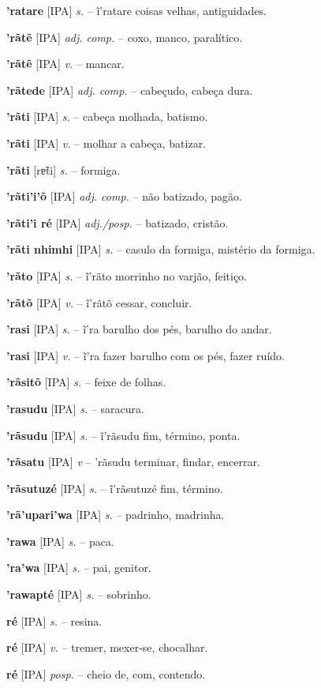 \textbf{'ratare} [IPA] \textit{s.} -- ĩ'ratare coisas velhas, antiguidades.

\textbf{'rãtẽ} [IPA] \textit{adj. comp.} -- coxo, manco, paralítico.

\textbf{'rãtẽ} [IPA] \textit{v.} -- mancar.

\textbf{'rãtede} [IPA] \textit{adj. comp.} -- cabeçudo, cabeça dura.

\textbf{'rãti} [IPA] \textit{s.} -- cabeça molhada, batismo.

\textbf{'rãti} [IPA] \textit{v.} -- molhar a cabeça, batizar.

\textbf{'rãti} [rɐ̃ti] \textit{s.} -- formiga.

\textbf{'rãti'i'õ} [IPA] \textit{adj. comp.} -- não batizado, pagão.

\textbf{'rãti'i ré} [IPA] \textit{adj./posp.} -- batizado, cristão.

\textbf{'rãti nhimhi} [IPA] \textit{s.} -- casulo da formiga, mistério da formiga.

\textbf{'rãto} [IPA] \textit{s.} -- ĩ'rãto morrinho no varjão, feitiço.

\textbf{'rãtõ} [IPA] \textit{v.} -- ĩ'rãtõ cessar, concluir.

\textbf{'rasi} [IPA] \textit{s.} -- ĩ'ra barulho dos pés, barulho do andar.

\textbf{'rasi} [IPA] \textit{v.} -- ĩ'ra fazer barulho com os pés, fazer ruído.

\textbf{'rãsitõ} [IPA] \textit{s.} -- feixe de folhas.

\textbf{'rasudu} [IPA] \textit{s.} -- saracura.

\textbf{'rãsudu} [IPA] \textit{s.} -- ĩ'rãsudu fim, término, ponta.

\textbf{'rãsatu} [IPA] \textit{v} -- 'rãsudu terminar, findar, encerrar.

\textbf{'rãsutuzé} [IPA] \textit{s.} -- ĩ'rãsutuzé fim, término.

\textbf{'rã'upari'wa} [IPA] \textit{s.} -- padrinho, madrinha.

\textbf{'rawa} [IPA] \textit{s.} -- paca.

\textbf{'ra'wa} [IPA] \textit{s.} -- pai, genitor.

\textbf{'rawapté} [IPA] \textit{s.} -- sobrinho.

\textbf{ré} [IPA] \textit{s.} -- resina.

\textbf{ré} [IPA] \textit{v.} -- tremer, mexer-se, chocalhar.

\textbf{ré} [IPA] \textit{posp.} -- cheio de, com, contendo.


